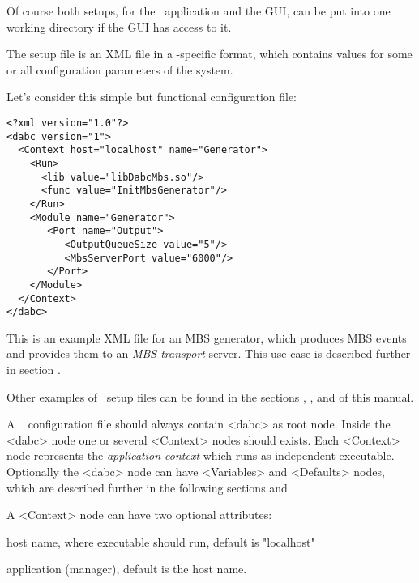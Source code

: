 Of course both setups, for the \dabc\ application and the GUI, can be
put into one working directory if the GUI has access to it.




The setup file is an XML file in a \dabc-specific format, 
which contains values for some or all configuration parameters of the system. 

Let's consider this simple but functional configuration file:

\begin{small}
\begin{verbatim}
<?xml version="1.0"?>
<dabc version="1">
  <Context host="localhost" name="Generator">
    <Run>
      <lib value="libDabcMbs.so"/>
      <func value="InitMbsGenerator"/>
    </Run>
    <Module name="Generator">
       <Port name="Output">
          <OutputQueueSize value="5"/>
          <MbsServerPort value="6000"/>
       </Port>
    </Module>
  </Context>
</dabc>
\end{verbatim}
\end{small}

This is an example XML file for an MBS generator, which produces 
MBS events and provides them to an {\em MBS transport} server. 
This use case is described further in section .

Other examples of \dabc\ setup files can be found in the sections
, , and 
of this manual.


A \dabc~ configuration file should always contain <dabc> as root node. 
Inside the <dabc> node one or several <Context> nodes should exists.
Each <Context> node represents the {\em application context} which runs as
independent executable. 
Optionally the <dabc> node can have <Variables> and <Defaults> nodes, 
which are described further in the following sections  
and .

A <Context> node can have two optional attributes:
\bdes
\item["host"] host name, where executable should run, default is "localhost"
\item["name"] application (manager), default is the host name.
\edes

